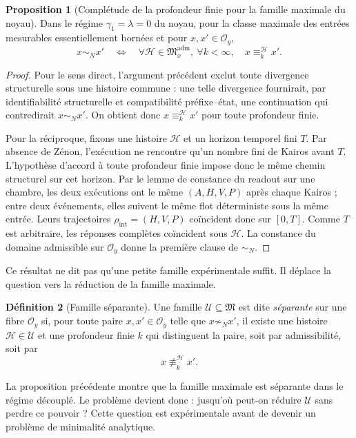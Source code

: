 \documentclass[11pt,a4paper]{article}
\theoremstyle{definition}
\newtheorem{definition}{Définition}[section]
\newtheorem{propositionthm}[definition]{Proposition}
\theoremstyle{remark}
\newcommand{\M}{\mathfrak M}
\newcommand{\Madm}{\mathfrak M^{\mathrm{adm}}}
\begin{document}
\begin{propositionthm}[Complétude de la profondeur finie pour la famille maximale du noyau]
Dans le régime $\gamma_1=\lambda=0$ du noyau, pour la classe maximale des entrées mesurables essentiellement bornées et pour $x,x'\in \mathcal O_y$,
\[
\boxed{
 x\sim_Nx'
 \quad\Longleftrightarrow\quad
 \forall\mathcal H\in\Madm_x,\ \forall k<\infty,
 \quad x\equiv_k^{\mathcal H}x'.}
\]
\end{propositionthm}

\begin{proof}
Pour le sens direct, l'argument précédent exclut toute divergence structurelle sous une histoire commune : une telle divergence fournirait, par identifiabilité structurelle et compatibilité préfixe--état, une continuation qui contredirait $x\sim_Nx'$. On obtient donc $x\equiv_k^{\mathcal H}x'$ pour toute profondeur finie.

Pour la réciproque, fixons une histoire $\mathcal H$ et un horizon temporel fini $T$. Par absence de Zénon, l'exécution ne rencontre qu'un nombre fini de Kairos avant $T$. L'hypothèse d'accord à toute profondeur finie impose donc le même chemin structurel sur cet horizon. Par le lemme de constance du readout sur une chambre, les deux exécutions ont le même $(A,H,V,P)$ après chaque Kairos ; entre deux événements, elles suivent le même flot déterministe sous la même entrée. Leurs trajectoires $\rho_{\mathrm{int}}=(H,V,P)$ coïncident donc sur $[0,T]$. Comme $T$ est arbitraire, les réponses complètes coïncident sous $\mathcal H$. La constance du domaine admissible sur $\mathcal O_y$ donne la première clause de $\sim_N$.
\end{proof}

Ce résultat ne dit pas qu'une petite famille expérimentale suffit. Il déplace la question vers la réduction de la famille maximale.

\begin{definition}[Famille séparante]
Une famille $\mathcal U\subseteq\M$ est dite \emph{séparante} sur une fibre $\mathcal O_y$ si, pour toute paire $x,x'\in \mathcal O_y$ telle que $x\not\sim_Nx'$, il existe une histoire $\mathcal H\in\mathcal U$ et une profondeur finie $k$ qui distinguent la paire, soit par admissibilité, soit par
\[
x\not\equiv_k^{\mathcal H}x'.
\]
\end{definition}

La proposition précédente montre que la famille maximale est séparante dans le régime découplé. Le problème devient donc : jusqu'où peut-on réduire $\mathcal U$ sans perdre ce pouvoir ? Cette question est expérimentale avant de devenir un problème de minimalité analytique.
\end{document}
